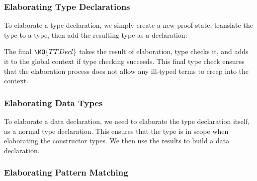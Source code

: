 \subsubsection{Elaborating Type Declarations}

To elaborate a type declaration, we simply create a new proof state,
translate the \IdrisM{} type to a \TT{} type, then add the resulting type
as a \TT{} declaration:


The final $\MO{TTDecl}$ takes the result of elaboration, type checks it,
and adds it to the global context if type checking succeeds. This final type check
ensures that the elaboration process does not allow any ill-typed terms to creep
into the context.

\subsubsection{Elaborating Data Types}

To elaborate a data declaration, we need to elaborate the type declaration itself,
as a normal type declaration. This ensures that the type is in scope when
elaborating the constructor types. We then use the results to build a \TT{} data
declaration.


\subsubsection{Elaborating Pattern Matching}


